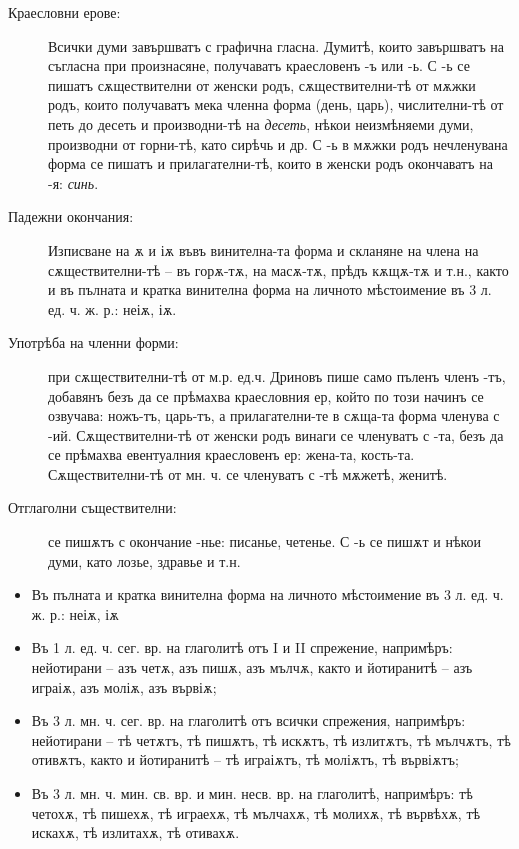 \documentclass{article}
\begin{document}
		\begin{description} 
		
		\item[Краесловни ерове:] Всички думи завършватъ с графична гласна. 
		Думитѣ, които завършватъ на съгласна при произнасяне, получаватъ краесловенъ -ъ или -ь. С -ь се пишатъ сѫществителни от женски родъ, сѫществителни-тѣ от мѫжки родъ, които получаватъ мека членна форма (день, царь), числителни-тѣ от петь до десеть и производни-тѣ на \textit{десеть}, нѣкои неизмѣняеми думи, производни от горни-тѣ, като сирѣчь и др. 
		С -ь в мѫжки родъ нечленувана форма се пишатъ и прилагателни-тѣ, които в женски родъ окончаватъ на -я: \textit{синь}.	
		
		\item[Падежни окончания:] Изписване на ѫ и іѫ въвъ винителна-та форма и скланяне на члена на сѫществителни-тѣ -- въ горѫ-тѫ, на масѫ-тѫ, прѣдъ кѫщѫ-тѫ и т.н., 
		както и въ пълната и кратка винителна форма на личното мѣстоимение въ 3 л. ед. ч. ж. р.: неіѫ, іѫ.
		
		\item[Употрѣба на членни форми:] при сѫществителни-тѣ от м.р. ед.ч. Дриновъ пише само пъленъ членъ -тъ, добавянъ безъ да се прѣмахва краесловния ер, който по този начинъ се озвучава: ножъ-тъ, царь-тъ, а прилагателни-те в сѫща-та форма членува с -ий. 
		Сѫществителни-тѣ от женски родъ винаги се членуватъ с -та, безъ да се прѣмахва евентуалния краесловенъ ер: жена-та, кость-та. 
		Сѫществителни-тѣ от мн. ч. се членуватъ с -тѣ мѫжетѣ, женитѣ.
		
		\item[Отглаголни съществителни:] се пишѫтъ с окончание -нье: писанье, четенье. С -ь се пишѫт и нѣкои думи, като лозье, здравье и т.н.
	
		\end{description}
	

	
	\begin{itemize}
		\item Въ пълната и кратка винителна форма на личното мѣстоимение въ 3 л. ед. ч. ж. р.: неіѫ, іѫ
		
		\item Въ 1 л. ед. ч. сег. вр. на глаголитѣ отъ I и II спрежение, напримѣръ: 
		нейотирани -- азъ четѫ, азъ пишѫ, азъ мълчѫ, 
		 както и йотиранитѣ --  азъ играіѫ, азъ моліѫ, азъ вървіѫ;
		 
		\item Въ 3 л. мн. ч. сег. вр. на глаголитѣ отъ всички спрежения, напримѣръ: 
			 нейотирани -- тѣ четѫтъ, тѣ пишѫтъ, тѣ искѫтъ, тѣ излитѫтъ, тѣ мълчѫтъ, тѣ отивѫтъ,
			 както и йотиранитѣ -- 
			тѣ играіѫтъ, тѣ моліѫтъ, тѣ вървіѫтъ;
		
		\item Въ 3 л. мн. ч. мин. св. вр. и мин. несв. вр. на глаголитѣ, напримѣръ: 
			тѣ четохѫ, тѣ пишехѫ, тѣ играехѫ, тѣ мълчахѫ, тѣ молихѫ, тѣ вървѣхѫ, тѣ искахѫ, тѣ излитахѫ, тѣ отивахѫ.
	\end{itemize}
\end{document}
